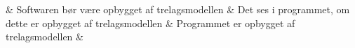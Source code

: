 \begin{longtable}
	&	Softwaren bør være opbygget af trelagsmodellen &	 Det ses i programmet, om dette er opbygget af trelagsmodellen 	&	Programmet er opbygget af trelagsmodellen	&	\\
\hline
\caption{Ikke-funktionelle krav}\\
\label{Ikke-funktionelle krav}
\end{longtable}




